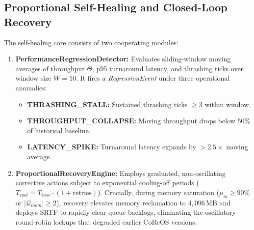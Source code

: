 \documentclass[conference]{IEEEtran}
\begin{document}
\subsection{Proportional Self-Healing and Closed-Loop Recovery}
The self-healing core consists of two cooperating modules:
\begin{enumerate}
    \item \textbf{PerformanceRegressionDetector:} Evaluates sliding-window moving averages of throughput $\bar{\Theta}$, p95 turnaround latency, and thrashing ticks over window size $W=10$. It fires a \textit{RegressionEvent} under three operational anomalies:
    \begin{itemize}
        \item \textbf{THRASHING\_STALL:} Sustained thrashing ticks $\ge 3$ within window.
        \item \textbf{THROUGHPUT\_COLLAPSE:} Moving throughput drops below $50\%$ of historical baseline.
        \item \textbf{LATENCY\_SPIKE:} Turnaround latency expands by $> 2.5\times$ moving average.
    \end{itemize}
    \item \textbf{ProportionalRecoveryEngine:} Employs graduated, non-oscillating corrective actions subject to exponential cooling-off periods ($T_{cool} = T_{base} \cdot (1 + \text{retries})$). Crucially, during memory saturation ($\mu_m \ge 90\%$ or $|\mathcal{Q}_{mem}| \ge 2$), recovery elevates memory reclamation to $4,096$\,MB and deploys SRTF to rapidly clear queue backlogs, eliminating the oscillatory round-robin lockups that degraded earlier CoReOS versions.
\end{enumerate}
\end{document}
